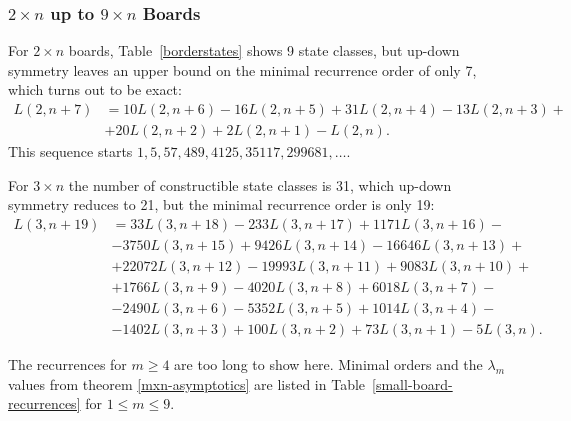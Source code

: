 \documentclass{article}
\begin{document}
\subsubsection{$2 \times n$ up to $9 \times n$ Boards}

For $2 \times n$ boards, Table~\ref{borderstates} shows 9 state classes,
but up-down symmetry leaves an upper bound on the minimal recurrence order
of only 7, which turns out to be exact:
\[
  \begin{split}
    L(2,n+7) &= 10 L(2,n+6) - 16 L(2,n+5) + 31 L(2,n+4) -13 L(2,n+3) +
    \\
    &+ 20 L(2,n+2) + 2 L(2,n+1) - L(2,n).
  \end{split}
\]
This sequence starts $1,5,57,489,4125,35117,299681,\ldots$.

For $3 \times n$ the number of constructible state classes is 31, which up-down
symmetry reduces to 21, but the minimal recurrence order is only 19:
\[
  \begin{split}
    L(3,n+19) &= 33 L(3,n+18) - 233 L(3,n+17) + 1171 L(3,n+16) - \\
    &- 3750 L(3,n+15) + 9426 L(3,n+14) - 16646 L(3,n+13) + \\
    &+ 22072 L(3,n+12) - 19993 L(3,n+11) + 9083 L(3,n+10) + \\
    &+ 1766 L(3,n+9) - 4020 L(3,n+8) + 6018 L(3,n+7) - \\
    &- 2490 L(3,n+6) - 5352 L(3,n+5) + 1014 L(3,n+4) - \\
    &- 1402 L(3,n+3) + 100 L(3,n+2) + 73 L(3,n+1) - 5 L(3,n).
  \end{split}
\]

The recurrences for $m \geq 4$ are too long to show here. Minimal
orders and the $\lambda_m$ values from theorem \ref{mxn-asymptotics}
are listed in Table~\ref{small-board-recurrences} for $1 \leq m \leq 9$.
\end{document}

